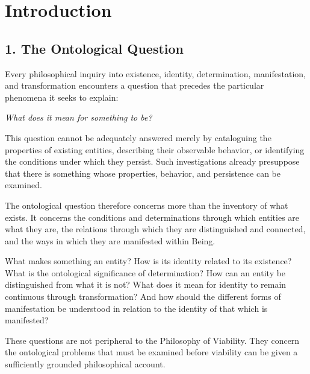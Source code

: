 
\cleardoublepage

\chapter*{Introduction}


\section*{1. The Ontological Question}

Every philosophical inquiry into existence, identity,
determination, manifestation, and transformation encounters
a question that precedes the particular phenomena it seeks
to explain:

\begin{center}
    \textit{What does it mean for something to be?}
\end{center}

This question cannot be adequately answered merely by
cataloguing the properties of existing entities, describing
their observable behavior, or identifying the conditions
under which they persist. Such investigations already
presuppose that there is something whose properties,
behavior, and persistence can be examined.

The ontological question therefore concerns more than
the inventory of what exists. It concerns the conditions
and determinations through which entities are what they
are, the relations through which they are distinguished
and connected, and the ways in which they are manifested
within Being.

What makes something an entity? How is its identity
related to its existence? What is the ontological
significance of determination? How can an entity be
distinguished from what it is not? What does it mean
for identity to remain continuous through transformation?
And how should the different forms of manifestation
be understood in relation to the identity of that which
is manifested?

These questions are not peripheral to the Philosophy
of Viability. They concern the ontological problems
that must be examined before viability can be given
a sufficiently grounded philosophical account.

